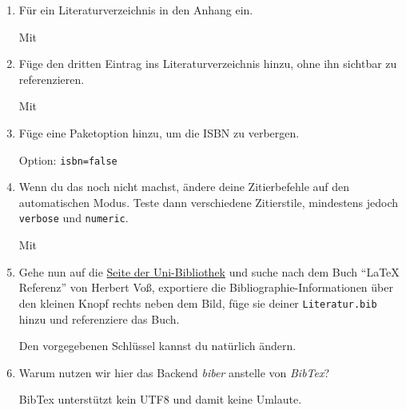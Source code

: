 \begin{enumerate}
        \item Für ein Literaturverzeichnis in den Anhang ein.
            \begin{loesung}
                Mit 
            \end{loesung}
        
        \item Füge den dritten Eintrag ins Literaturverzeichnis hinzu, ohne ihn
            sichtbar zu referenzieren.
            \begin{loesung}
                Mit 
            \end{loesung}
        
        \item Füge eine Paketoption hinzu, um die ISBN zu verbergen.
            \begin{loesung}
                Option: \verb|isbn=false|
            \end{loesung}
        
        \item Wenn du das noch nicht machst, ändere deine Zitierbefehle auf den
            automatischen Modus. Teste dann verschiedene Zitierstile, mindestens
            jedoch \texttt{verbose} und \texttt{numeric}.
            \begin{loesung}
                Mit 
            \end{loesung}
        
        \item Gehe nun auf die \href{http://www.suub.uni-bremen.de/}{Seite der
            Uni-Bibliothek} und suche nach dem Buch \enquote{LaTeX Referenz}
            von Herbert Voß, exportiere die Bibliographie-Informationen über den
            kleinen Knopf rechts neben dem Bild, füge sie deiner
            \texttt{Literatur.bib} hinzu und referenziere das Buch.
            \begin{hinweis}
                Den vorgegebenen Schlüssel kannst du natürlich ändern.
            \end{hinweis}
        
        \item Warum nutzen wir hier das Backend \emph{biber} anstelle von
            \emph{BibTex}?
            \begin{loesung}
                BibTex unterstützt kein UTF8 und damit keine Umlaute.
            \end{loesung}
    \end{enumerate}
